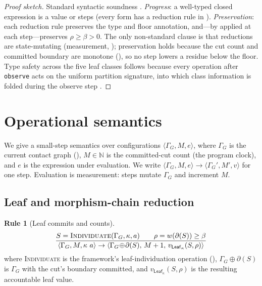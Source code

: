 \documentclass[11pt,a4paper]{article}
\theoremstyle{thmstyle}
\theoremstyle{definition}
\newtheorem{rulename}[theorem]{Rule}
\theoremstyle{remark}
\newcommand{\N}{\mathbb{N}}
\newcommand{\flo}{\beta}
\newcommand{\res}{\rho}
\newcommand{\cut}{\partial}
\newcommand{\shk}[1]{\texttt{#1}}
\begin{document}
\begin{proof}[Proof sketch]
Standard syntactic soundness \citep{pierce2002}. \emph{Progress}: a
well-typed closed expression is a value or steps (every form has a
reduction rule in ). \emph{Preservation}: each reduction
rule preserves the type and floor annotation, and---by
 applied at each step---preserves $\res\ge\flo>0$.
The only non-standard clause is that reductions are state-mutating
(measurement, ); preservation holds because the cut
count and committed boundary are monotone (), so no step
lowers a residue below the floor. Type safety across the five leaf classes
follows because every operation after \shk{observe} acts on the uniform
partition signature, into which class information is folded during the
observe step \citep{sachikonye2025expralg}.
\end{proof}

\section{Operational semantics}
\label{sec:opsem}

We give a small-step semantics over configurations
$\langle\Gamma_G,M,e\rangle$, where $\Gamma_G$ is the current contact graph
(), $M\in\N$ is the committed-cut count (the
program clock), and $e$ is the expression under evaluation. We write
$\langle\Gamma_G,M,e\rangle\to\langle\Gamma_G',M',v\rangle$ for one step.
Evaluation is measurement: steps mutate $\Gamma_G$ and increment $M$.

\subsection{Leaf and morphism-chain reduction}

\begin{rulename}[Leaf commits and counts]
\label{rule:leaf-step}
\[
\frac{S=\textsc{Individuate}(\Gamma_G,\kappa,a)\qquad
      \res=w(\cut(S))\ge\flo}
     {\langle\Gamma_G,M,\kappa\ a\rangle \to
      \langle\Gamma_G\!\oplus\!\cut(S),\,M+1,\,
      v_{\mathsf{Leaf}_\kappa}(S,\res)\rangle}
\]
where \textsc{Individuate} is the framework's leaf-individuation operation
(), $\Gamma_G\!\oplus\!\cut(S)$ is $\Gamma_G$ with the
cut's boundary committed, and $v_{\mathsf{Leaf}_\kappa}(S,\res)$ is the
resulting accountable leaf value.
\end{rulename}
\end{document}
